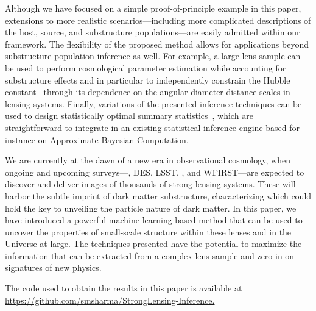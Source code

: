 \documentclass[twocolumn]{aastex63}
\begin{document}
Although we have focused on a simple proof-of-principle example in this paper, extensions to more realistic scenarios---including more complicated descriptions of the host, source, and substructure populations---are easily admitted within our framework.  The flexibility of the proposed method allows for applications beyond substructure population inference as well. For example, a large lens sample can be used to perform cosmological parameter estimation while accounting for substructure effects and in particular to independently constrain the Hubble constant~\citep{1907.02533,1907.04869} through its dependence on the angular diameter distance scales in lensing systems. Finally, variations of the presented inference techniques can be used to design statistically optimal summary statistics~\citep{1805.12244}, which are straightforward to integrate in an existing statistical inference engine based for instance on Approximate Bayesian Computation.


We are currently at the dawn of a new era in observational cosmology, when ongoing and upcoming surveys---\eg, DES, LSST, \Euclid, and WFIRST---are expected to discover and deliver images of thousands of strong lensing systems. These will harbor the subtle imprint of dark matter substructure, characterizing which could hold the key to unveiling the particle nature of dark matter. In this paper, we have introduced a powerful machine learning-based method that can be used to uncover the properties of small-scale structure within these lenses and in the Universe at large. The techniques presented have the potential to maximize the information that can be extracted from a complex lens sample and zero in on signatures of new physics.

The code used to obtain the results in this paper is available at \url{https://github.com/smsharma/StrongLensing-Inference}\href{https://github.com/smsharma/StrongLensing-Inference}.
\newpage
\end{document}
